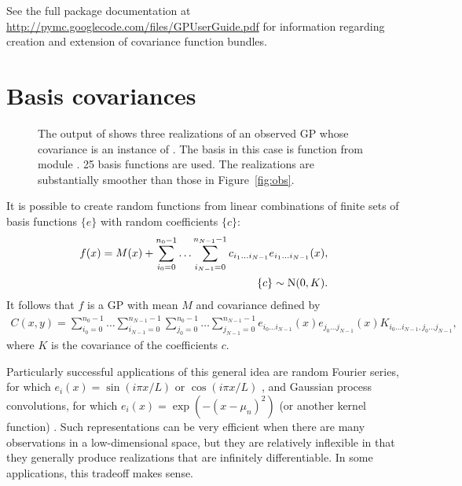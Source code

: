 \documentclass[article]{jss}
\begin{document}
See the full package documentation at \href{http://pymc.googlecode.com/files/GPUserGuide.pdf}{http://pymc.googlecode.com/files/GPUserGuide.pdf} for information regarding creation and extension of covariance function bundles.

\section{Basis covariances}\label{sec:basis}

\begin{figure}[htbp]
    \centering
        \caption{The output of  shows three realizations of an observed GP whose covariance is an instance of . The basis in this case is function  from module . 25 basis functions are used. The realizations are substantially smoother than those in Figure~\ref{fig:obs}.}
    \label{fig:basiscov}
\end{figure}

It is possible to create random functions from linear combinations of finite sets of basis functions $\{e\}$ with random coefficients $\{c\}$:
\begin{eqnarray*}
    f(x) = M(x) + \sum_{i_0=0}^{n_0-1}\ldots \sum_{i_{N-1}=0}^{n_{N-1}-1} c_{i_1\ldots i_{N-1}} e_{i_1\ldots i_{N-1}}(x), \\
    \{c\}\sim \textup{N}(0,K).
\end{eqnarray*}
It follows that $f$ is a GP with mean $M$ and covariance defined by
\begin{eqnarray*}
    C(x,y)=\sum_{i_0=0}^{n_0-1}\ldots \sum_{i_{N-1}=0}^{n_{N-1}-1} \sum_{j_0=0}^{n_0-1}\ldots \sum_{j_{N-1}=0}^{n_{N-1}-1} e_{i_0\ldots i_{N-1}}(x) e_{j_0\ldots j_{N-1}}(x) K_{i_0\ldots i_{N-1}, j_0\ldots j_{N-1}},
\end{eqnarray*}
where $K$ is the covariance of the coefficients $c$.

Particularly successful applications of this general idea are random Fourier series, for which $e_i(x) = \sin(i\pi x/L)$ or $\cos(i\pi x/L)$ \citep{spanos}, and Gaussian process convolutions, for which $e_i(x) = \exp(-(x-\mu_n)^2)$ (or another kernel function) \citep{convolution}. Such representations can be very efficient when there are many observations in a low-dimensional space, but they are relatively inflexible in that they generally produce realizations that are infinitely differentiable. In some applications, this tradeoff makes sense.
\end{document}
